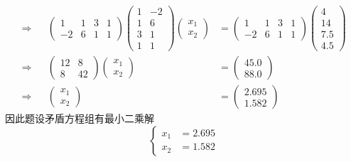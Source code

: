 \documentclass[11pt]{article}
\begin{document}
\begin{question}
{\begin{align*}
			\Rightarrow &   & \begin{pmatrix}
				1  & 1 & 3 & 1 \\
				-2 & 6 & 1 & 1
			\end{pmatrix}
			\begin{pmatrix}
				1 & -2 \\
				1 & 6  \\
				3 & 1  \\
				1 & 1
			\end{pmatrix}
			\begin{pmatrix}
				x_1 \\
				x_2
			\end{pmatrix}
			            & =
			\begin{pmatrix}
				1  & 1 & 3 & 1 \\
				-2 & 6 & 1 & 1
			\end{pmatrix}
			\begin{pmatrix}
				4   \\
				14  \\
				7.5 \\
				4.5
			\end{pmatrix}                                     \\
			\Rightarrow &   & \begin{pmatrix}
				12 & 8  \\
				8  & 42
			\end{pmatrix}
			\begin{pmatrix}
				x_1 \\
				x_2
			\end{pmatrix}
			            & =
			\begin{pmatrix}
				45.0 \\
				88.0
			\end{pmatrix}                                     \\
			\Rightarrow &   & \begin{pmatrix}
				x_1 \\
				x_2
			\end{pmatrix}
			            & =
			\begin{pmatrix}
				2.695 \\
				1.582
			\end{pmatrix}
		\end{align*}
		因此题设矛盾方程组有最小二乘解
		\begin{equation*}
			\left\{
			\begin{aligned}
				x_1 & = 2.695 \\
				x_2 & = 1.582
			\end{aligned}
			\right.
		\end{equation*}
	}
\end{question}
\end{document}
